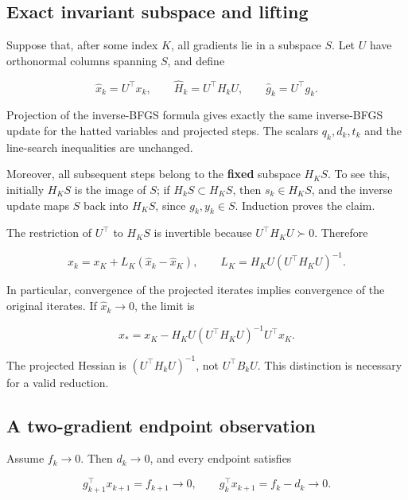 

\subsection{Exact invariant subspace and
lifting}\label{H:exact-invariant-subspace-and-lifting}

Suppose that, after some index \(K\), all gradients lie in a subspace
\(S\). Let \(U\) have orthonormal columns spanning \(S\), and define

\[
\widehat x_k=U^\top x_k,\qquad
\widehat H_k=U^\top H_kU,\qquad
\widehat g_k=U^\top g_k.
\]

Projection of the inverse-BFGS formula gives exactly the same
inverse-BFGS update for the hatted variables and projected steps. The
scalars \(q_k,d_k,t_k\) and the line-search inequalities are unchanged.

Moreover, all subsequent steps belong to the \textbf{fixed} subspace
\(H_KS\). To see this, initially \(H_KS\) is the image of \(S\); if
\(H_kS\subset H_KS\), then \(s_k\in H_KS\), and the inverse update maps
\(S\) back into \(H_KS\), since \(g_k,y_k\in S\). Induction proves the
claim.

The restriction of \(U^\top\) to \(H_KS\) is invertible because
\(U^\top H_KU\succ0\). Therefore

\[
\boxed{
x_k=x_K+L_K(\widehat x_k-\widehat x_K),\qquad
L_K=H_KU(U^\top H_KU)^{-1}.
}
\tag{7.7.1}
\]

In particular, convergence of the projected iterates implies convergence
of the original iterates. If \(\widehat x_k\to0\), the limit is

\[
\boxed{x_*=x_K-H_KU(U^\top H_KU)^{-1}U^\top x_K.}
\tag{7.7.2}
\]

The projected Hessian is \((U^\top H_kU)^{-1}\), not \(U^\top B_kU\).
This distinction is necessary for a valid reduction.



\subsection{A two-gradient endpoint
observation}\label{H:a-two-gradient-endpoint-observation}

Assume \(f_k\to0\). Then \(d_k\to0\), and every endpoint satisfies

\[
g_{k+1}^\top x_{k+1}=f_{k+1}\longrightarrow0,
\qquad
g_k^\top x_{k+1}=f_k-d_k\longrightarrow0.
\tag{7.7.3}
\]

